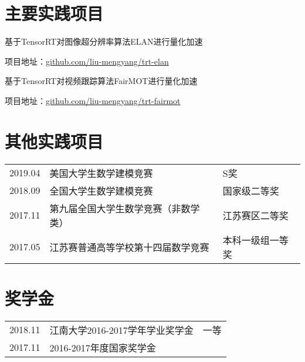 \documentclass[]{deedy-resume-openfont}
\begin{document}
\begin{minipage}[t]{0.73\textwidth}
    \section{主要实践项目}
	\begin{tightemize}
		\item 基于TensorRT对图像超分辨率算法ELAN进行量化加速
		\item 项目地址：\href{https://github.com/liu-mengyang/trt-elan}{github.com/liu-mengyang/trt-elan}
	\end{tightemize}
	\sectionsep

	\begin{tightemize}
		\item 基于TensorRT对视频跟踪算法FairMOT进行量化加速
		\item 项目地址：\href{https://github.com/liu-mengyang/trt-fairmot}{github.com/liu-mengyang/trt-fairmot}
	\end{tightemize}
	\sectionsep


	\section{其他实践项目}
    \begin{tabular}{lll}
        2019.04 & 美国大学生数学建模竞赛 & S奖 \\
        2018.09 & 全国大学生数学建模竞赛 & 国家级二等奖 \\
        2017.11 & 第九届全国大学生数学竞赛（非数学类） & 江苏赛区二等奖 \\
        2017.05 & 江苏赛普通高等学校第十四届数学竞赛 & 本科一级组一等奖\\
	\end{tabular}
    \sectionsep

	\section{奖学金}
    \begin{tabular}{lll}
        2018.11 & 江南大学2016-2017学年学业奖学金 & 一等 \\
        2017.11 & 2016-2017年度国家奖学金 & \\
	\end{tabular}
    \sectionsep
\end{minipage}
\end{document}
